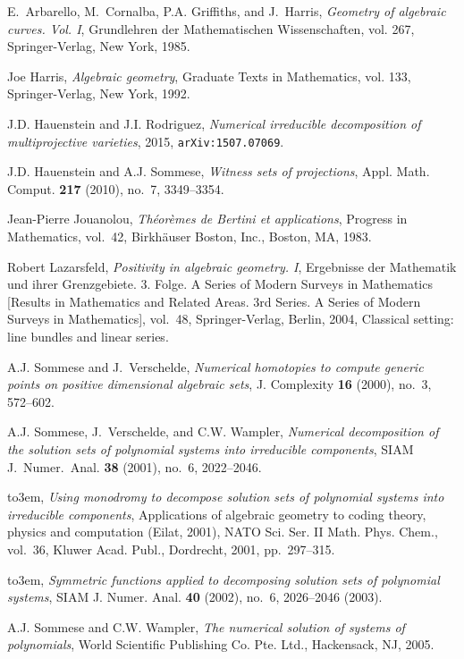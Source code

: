 \documentclass[12pt]{amsart}
\theoremstyle{definition}
\begin{document}

\providecommand{\bysame}{\leavevmode\hbox to3em{\hrulefill}\thinspace}
\providecommand{\MR}{\relax\ifhmode\unskip\space\fi MR }
\providecommand{\MRhref}[2]{  \href{http://www.ams.org/mathscinet-getitem?mr=#1}{#2}
}
\providecommand{\href}[2]{#2}
\begin{thebibliography}{10}

E.~Arbarello, M.~Cornalba, P.A. Griffiths, and J.~Harris, \emph{Geometry of
  algebraic curves. {V}ol. {I}}, Grundlehren der Mathematischen Wissenschaften,
  vol. 267, Springer-Verlag, New York, 1985.

Joe Harris, \emph{Algebraic geometry}, Graduate Texts in Mathematics, vol. 133,
  Springer-Verlag, New York, 1992.

J.D. Hauenstein and J.I. Rodriguez, \emph{Numerical irreducible decomposition
  of multiprojective varieties}, 2015, {\tt arXiv:1507.07069}.

J.D. Hauenstein and A.J. Sommese, \emph{Witness sets of projections}, Appl.
  Math. Comput. \textbf{217} (2010), no.~7, 3349--3354.

Jean-Pierre Jouanolou, \emph{Th\'eor\`emes de {B}ertini et applications},
  Progress in Mathematics, vol.~42, Birkh\"auser Boston, Inc., Boston, MA,
  1983.

Robert Lazarsfeld, \emph{Positivity in algebraic geometry. {I}}, Ergebnisse der
  Mathematik und ihrer Grenzgebiete. 3. Folge. A Series of Modern Surveys in
  Mathematics [Results in Mathematics and Related Areas. 3rd Series. A Series
  of Modern Surveys in Mathematics], vol.~48, Springer-Verlag, Berlin, 2004,
  Classical setting: line bundles and linear series.

A.J. Sommese and J.~Verschelde, \emph{Numerical homotopies to compute generic
  points on positive dimensional algebraic sets}, J. Complexity \textbf{16}
  (2000), no.~3, 572--602.

A.J. Sommese, J.~Verschelde, and C.W. Wampler, \emph{Numerical decomposition of
  the solution sets of polynomial systems into irreducible components}, SIAM
  J.\ Numer.\ Anal. \textbf{38} (2001), no.~6, 2022--2046.

\bysame, \emph{Using monodromy to decompose solution sets of polynomial systems
  into irreducible components}, Applications of algebraic geometry to coding
  theory, physics and computation ({E}ilat, 2001), NATO Sci. Ser. II Math.
  Phys. Chem., vol.~36, Kluwer Acad. Publ., Dordrecht, 2001, pp.~297--315.

\bysame, \emph{Symmetric functions applied to decomposing solution sets of
  polynomial systems}, SIAM J. Numer. Anal. \textbf{40} (2002), no.~6,
  2026--2046 (2003).

A.J. Sommese and C.W. Wampler, \emph{The numerical solution of systems of
  polynomials}, World Scientific Publishing Co. Pte. Ltd., Hackensack, NJ,
  2005.

\end{thebibliography}
\end{document}
